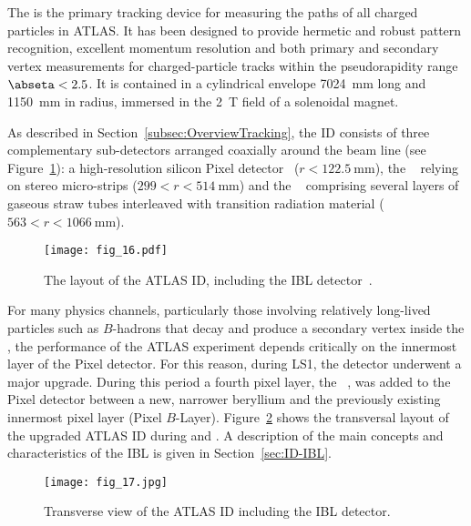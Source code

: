 \documentclass[cernpreprint, atlasdraft=false, UKenglish,british,orcidlogo, texmf, orcidlogo]{atlasdoc}
\begin{document}
 

 
 
The  is the primary tracking device for measuring the paths of all charged particles in ATLAS. It has been designed to provide hermetic and robust pattern recognition, excellent momentum resolution and both primary and secondary vertex measurements for charged-particle tracks within the pseudorapidity range $\abseta<2.5$. It is contained in a cylindrical envelope 
\SI{7024}{\mm}
long and \SI{1150}{\mm} in radius, immersed in the \SI{2}{\tesla} field of a solenoidal magnet.
 
As described in Section~\ref{subsec:OverviewTracking}, the \gls{ID} consists of three complementary sub-detectors arranged coaxially around the beam line (see Figure~\ref{fig:ID_Run2Layout}): a high-resolution silicon Pixel detector~\cite{Pixel} ($r< \SI{122.5}{\mm}$), the ~\cite{IDET-2013-01} relying on stereo micro-strips ($299<  r< \SI{514}{\mm}$) and the ~\cite{TRT} comprising several layers of gaseous straw tubes interleaved with transition radiation material ($563<  r< \SI{1066}{\mm}$).
 
\begin{figure}[h!]
\centering
\texttt{[image: fig\_16.pdf]}
\caption{The layout of the ATLAS \gls{ID}, including the \gls{IBL} detector~\cite{PIX-2018-001}.}
\label{fig:ID_Run2Layout}
\end{figure}
 
For many physics channels, particularly those involving relatively long-lived particles such as $B$-hadrons that decay and produce a secondary vertex inside the \beampipe, the performance of the ATLAS experiment depends critically on the innermost layer of the Pixel detector. For this reason,
during \gls{LS1}, the detector underwent a major upgrade. During this period a fourth pixel layer, the ~\cite{ATLAS-TDR-19,ATLAS-TDR-19-addm,PIX-2018-001}, 
was added to the Pixel detector between a new, narrower beryllium \beampipe and the previously existing innermost pixel layer (Pixel $B$-Layer). Figure~\ref{fig:IDRun2} shows the transversal layout of the upgraded ATLAS \gls{ID} during \RunTwo and \RunThr. A description of the main concepts and characteristics of the \gls{IBL} is given in Section~\ref{sec:ID-IBL}.
 
\begin{figure}[h!]
\centering
\texttt{[image: fig\_17.jpg]}
\caption{Transverse view of the ATLAS \gls{ID} including the \gls{IBL} detector.}
\label{fig:IDRun2}
\end{figure}
 
\end{document}
